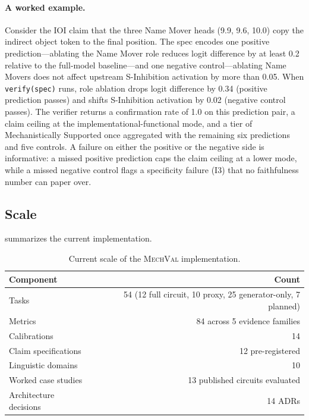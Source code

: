 \documentclass[10pt]{article}
\newcommand{\mechval}{\textsc{MechVal}}
\newcommand{\tighttable}{\setlength{\tabcolsep}{4pt}\renewcommand{\arraystretch}{1.05}}
\begin{document}
\paragraph{A worked example.} Consider the IOI claim that the three Name Mover heads (9.9, 9.6, 10.0) copy the indirect object token to the final position. The spec encodes one positive prediction---ablating the Name Mover role reduces logit difference by at least 0.2 relative to the full-model baseline---and one negative control---ablating Name Movers does not affect upstream S-Inhibition activation by more than 0.05. When \texttt{verify(spec)} runs, role ablation drops logit difference by 0.34 (positive prediction passes) and shifts S-Inhibition activation by 0.02 (negative control passes). The verifier returns a confirmation rate of 1.0 on this prediction pair, a claim ceiling at the implementational-functional mode, and a tier of Mechanistically Supported once aggregated with the remaining six predictions and five controls. A failure on either the positive or the negative side is informative: a missed positive prediction caps the claim ceiling at a lower mode, while a missed negative control flags a specificity failure (I3) that no faithfulness number can paper over.

\subsection{Scale}
\label{sec:scale}

 summarizes the current implementation.

\begin{table}[t]
\centering
\tighttable
\caption{Current scale of the \mechval{} implementation.}
\label{tab:scale}
\small
\begin{tabular}{@{}lr@{}}
\toprule
\textbf{Component} & \textbf{Count} \\
\midrule
Tasks & 54 (12 full circuit, 10 proxy, 25 generator-only, 7 planned) \\
Metrics & 84 across 5 evidence families \\
Calibrations & 14 \\
Claim specifications & 12 pre-registered \\
Linguistic domains & 10 \\
Worked case studies & 13 published circuits evaluated \\
Architecture decisions & 14 ADRs \\
\bottomrule
\end{tabular}
\end{table}
\end{document}

